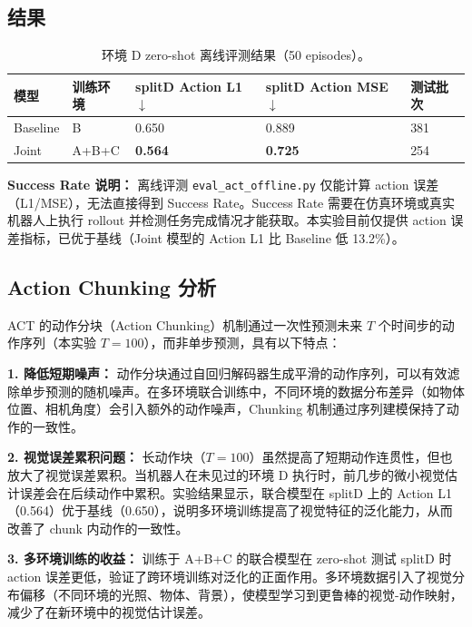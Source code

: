 \documentclass[12pt,a4paper,fontset=fandol]{ctexart}
\begin{document}
\subsection{结果}

\begin{table}[H]
\centering
\begin{tabular}{lllll}
\toprule
模型 & 训练环境 & splitD Action L1 $\downarrow$ & splitD Action MSE $\downarrow$ & 测试批次 \\
\midrule
Baseline & B & 0.650 & 0.889 & 381 \\
Joint & A+B+C & \textbf{0.564} & \textbf{0.725} & 254 \\
\bottomrule
\end{tabular}
\caption{环境 D zero-shot 离线评测结果（50 episodes）。}
\label{tab:act_results}
\end{table}

\textbf{Success Rate 说明：} 离线评测 \texttt{eval\_act\_offline.py} 仅能计算 action 误差（L1/MSE），无法直接得到 Success Rate。Success Rate 需要在仿真环境或真实机器人上执行 rollout 并检测任务完成情况才能获取。本实验目前仅提供 action 误差指标，已优于基线（Joint 模型的 Action L1 比 Baseline 低 13.2\%）。

\subsection{Action Chunking 分析}

ACT 的动作分块（Action Chunking）机制通过一次性预测未来 $T$ 个时间步的动作序列（本实验 $T=100$），而非单步预测，具有以下特点：

\textbf{1. 降低短期噪声：} 动作分块通过自回归解码器生成平滑的动作序列，可以有效滤除单步预测的随机噪声。在多环境联合训练中，不同环境的数据分布差异（如物体位置、相机角度）会引入额外的动作噪声，Chunking 机制通过序列建模保持了动作的一致性。

\textbf{2. 视觉误差累积问题：} 长动作块（$T=100$）虽然提高了短期动作连贯性，但也放大了视觉误差累积。当机器人在未见过的环境 D 执行时，前几步的微小视觉估计误差会在后续动作中累积。实验结果显示，联合模型在 splitD 上的 Action L1（0.564）优于基线（0.650），说明多环境训练提高了视觉特征的泛化能力，从而改善了 chunk 内动作的一致性。

\textbf{3. 多环境训练的收益：} 训练于 A+B+C 的联合模型在 zero-shot 测试 splitD 时 action 误差更低，验证了跨环境训练对泛化的正面作用。多环境数据引入了视觉分布偏移（不同环境的光照、物体、背景），使模型学习到更鲁棒的视觉-动作映射，减少了在新环境中的视觉估计误差。
\end{document}
